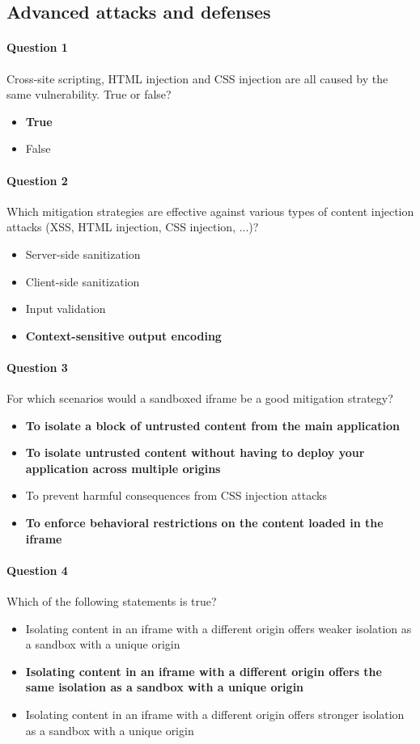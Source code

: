 \documentclass[titlepage]{article}
\begin{document}
    \subsection{Advanced attacks and defenses}
    \paragraph{Question 1} Cross-site scripting, HTML injection and CSS injection are all caused by the same vulnerability. True or false?
    \begin{itemize}
        \item \textbf{True} \checkmark
        \item False
    \end{itemize}
    \paragraph{Question 2} Which mitigation strategies are effective against various types of content injection attacks (XSS, HTML injection, CSS injection, ...)?
    \begin{itemize}
        \item Server-side sanitization
        \item Client-side sanitization
        \item Input validation
        \item \textbf{Context-sensitive output encoding} \checkmark
    \end{itemize}
    \paragraph{Question 3} For which scenarios would a sandboxed iframe be a good mitigation strategy?
    \begin{itemize}
        \item \textbf{To isolate a block of untrusted content from the main application} \checkmark
        \item \textbf{To isolate untrusted content without having to deploy your application across multiple origins} \checkmark
        \item To prevent harmful consequences from CSS injection attacks
        \item \textbf{To enforce behavioral restrictions on the content loaded in the iframe} \checkmark
    \end{itemize}
    \paragraph{Question 4} Which of the following statements is true?
    \begin{itemize}
        \item Isolating content in an iframe with a different origin offers weaker isolation as a sandbox with a unique origin
        \item \textbf{Isolating content in an iframe with a different origin offers the same isolation as a sandbox with a unique origin} \checkmark
        \item Isolating content in an iframe with a different origin offers stronger isolation as a sandbox with a unique origin
    \end{itemize}
\end{document}
